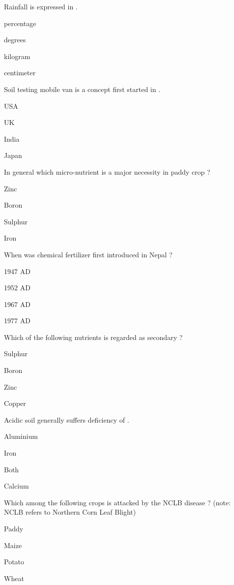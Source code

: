 \begin{questions}
\question Rainfall is expressed in \fillin[][3cm].
\begin{items}
\item percentage
\item degrees
\item kilogram
\item* centimeter
\end{items}

\question Soil testing mobile van is a concept first started in \fillin[][3cm].
\begin{items}
\item USA
\item UK
\item* India
\item Japan
\end{items}

\question In general which micro-nutrient is a major necessity in paddy crop ?
\begin{items}
\item* Zinc
\item Boron
\item Sulphur
\item Iron
\end{items}

\question When was chemical fertilizer first introduced in Nepal ?
\begin{items}
\item 1947 AD
\item* 1952 AD
\item 1967 AD
\item 1977 AD
\end{items}

\question Which of the following nutrients is regarded as secondary ?
\begin{items}
\item* Sulphur
\item Boron
\item Zinc
\item Copper
\end{items}

\question Acidic soil generally suffers deficiency of \fillin[][3cm].
\begin{items}
\item Aluminium
\item Iron
\item Both
\item* Calcium
\end{items}

\question Which among the following crops is attacked by the NCLB disease ?
(note: NCLB refers to Northern Corn Leaf Blight)
\begin{items}
\item Paddy
\item* Maize
\item Potato
\item Wheat
\end{items}


\end{questions}
